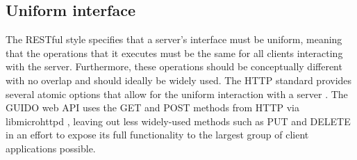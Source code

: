 \documentclass[11pt,a4paper]{article}
\begin{document}
\subsection{Uniform interface}
The RESTful style specifies that a server's interface must be uniform, meaning that the operations that it executes must be the same for all clients interacting with the server.  Furthermore, these operations should be conceptually different with no overlap and should ideally be widely used.  The HTTP standard provides several atomic options that allow for the uniform interaction with a server \cite{richardson2008restful}.  The GUIDO web API uses the GET and POST methods from HTTP via libmicrohttpd \cite{libmicrohttpd}, leaving out less widely-used methods such as PUT and DELETE in an effort to expose its full functionality to the largest group of client applications possible.
\end{document}
